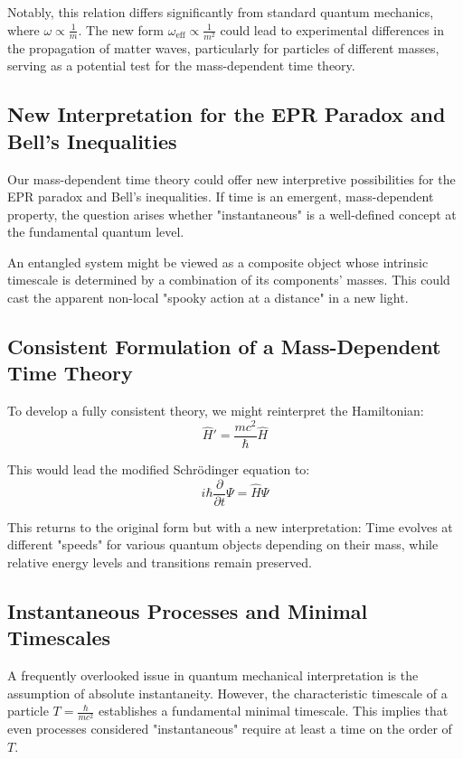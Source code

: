 \documentclass{article}
\begin{document}
	Notably, this relation differs significantly from standard quantum mechanics, where $\omega \propto \frac{1}{m}$. The new form $\omega_{\text{eff}} \propto \frac{1}{m^2}$ could lead to experimental differences in the propagation of matter waves, particularly for particles of different masses, serving as a potential test for the mass-dependent time theory.
	
	\subsection{New Interpretation for the EPR Paradox and Bell’s Inequalities}
	
	Our mass-dependent time theory could offer new interpretive possibilities for the EPR paradox and Bell’s inequalities. If time is an emergent, mass-dependent property, the question arises whether "instantaneous" is a well-defined concept at the fundamental quantum level.
	
	An entangled system might be viewed as a composite object whose intrinsic timescale is determined by a combination of its components’ masses. This could cast the apparent non-local "spooky action at a distance" in a new light.
	
	\subsection{Consistent Formulation of a Mass-Dependent Time Theory}
	
	To develop a fully consistent theory, we might reinterpret the Hamiltonian:
	\begin{equation}
		\hat{H}' = \frac{mc^2}{\hbar} \hat{H}
	\end{equation}
	
	This would lead the modified Schrödinger equation to:
	\begin{equation}
		i\hbar \frac{\partial}{\partial t}\Psi = \hat{H}\Psi
	\end{equation}
	
	This returns to the original form but with a new interpretation: Time evolves at different "speeds" for various quantum objects depending on their mass, while relative energy levels and transitions remain preserved.
	
	\subsection{Instantaneous Processes and Minimal Timescales}
	
	A frequently overlooked issue in quantum mechanical interpretation is the assumption of absolute instantaneity. However, the characteristic timescale of a particle $T = \frac{\hbar}{mc^2}$ establishes a fundamental minimal timescale. This implies that even processes considered "instantaneous" require at least a time on the order of $T$.
	
\end{document}
